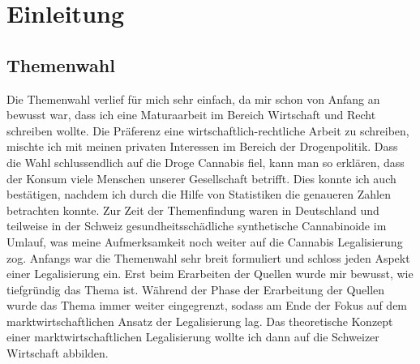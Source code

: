 \documentclass[../main.tex]{subfiles}
\begin{document}
	 \section{Einleitung}
	 
	 \subsection{Themenwahl}
	 Die Themenwahl verlief für mich sehr einfach, da mir schon von Anfang an bewusst war, dass ich eine Maturaarbeit im Bereich Wirtschaft und Recht schreiben wollte. 
	 Die Präferenz eine wirtschaftlich-rechtliche Arbeit zu schreiben, mischte ich mit meinen privaten Interessen im Bereich der Drogenpolitik. 
	 Dass die Wahl schlussendlich auf die Droge Cannabis fiel, kann man so erklären, dass der Konsum viele Menschen unserer Gesellschaft betrifft. 
	 Dies konnte ich auch bestätigen, nachdem ich durch die Hilfe von Statistiken die genaueren Zahlen betrachten konnte. 
	 Zur Zeit der Themenfindung waren in Deutschland und teilweise in der Schweiz gesundheitsschädliche synthetische Cannabinoide im Umlauf, was meine Aufmerksamkeit noch weiter auf die Cannabis Legalisierung zog.
	 Anfangs war die Themenwahl sehr breit formuliert und schloss jeden Aspekt einer Legalisierung ein. 
	 Erst beim Erarbeiten der Quellen wurde mir bewusst, wie tiefgründig das Thema ist. 
	 Während der Phase der Erarbeitung der Quellen wurde das Thema immer weiter eingegrenzt, sodass am Ende der Fokus auf dem marktwirtschaftlichen Ansatz der Legalisierung lag. 
	 Das theoretische Konzept einer marktwirtschaftlichen Legalisierung wollte ich dann auf die Schweizer Wirtschaft abbilden.
	 
\end{document}
